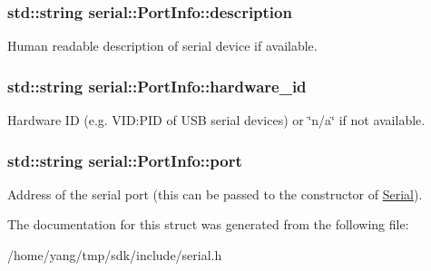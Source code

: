 \subsubsection[{\texorpdfstring{description}{description}}]{\setlength{\rightskip}{0pt plus 5cm}std\+::string serial\+::\+Port\+Info\+::description}\hypertarget{structserial_1_1_port_info_a2ba37dd33d47b554aef5c15c1fe8b872}{}\label{structserial_1_1_port_info_a2ba37dd33d47b554aef5c15c1fe8b872}
Human readable description of serial device if available. 
\subsubsection[{\texorpdfstring{hardware\+\_\+id}{hardware_id}}]{\setlength{\rightskip}{0pt plus 5cm}std\+::string serial\+::\+Port\+Info\+::hardware\+\_\+id}\hypertarget{structserial_1_1_port_info_a7d55368e1a4e6ccc9da6f4d339524837}{}\label{structserial_1_1_port_info_a7d55368e1a4e6ccc9da6f4d339524837}
Hardware ID (e.\+g. V\+ID\+:P\+ID of U\+SB serial devices) or \char`\"{}n/a\char`\"{} if not available. 
\subsubsection[{\texorpdfstring{port}{port}}]{\setlength{\rightskip}{0pt plus 5cm}std\+::string serial\+::\+Port\+Info\+::port}\hypertarget{structserial_1_1_port_info_a5d4242cdd6c0d01260e24964af4c23d2}{}\label{structserial_1_1_port_info_a5d4242cdd6c0d01260e24964af4c23d2}
Address of the serial port (this can be passed to the constructor of \hyperlink{classserial_1_1_serial}{Serial}). 

The documentation for this struct was generated from the following file\+:\begin{DoxyCompactItemize}
\item 
/home/yang/tmp/sdk/include/serial.\+h\end{DoxyCompactItemize}
